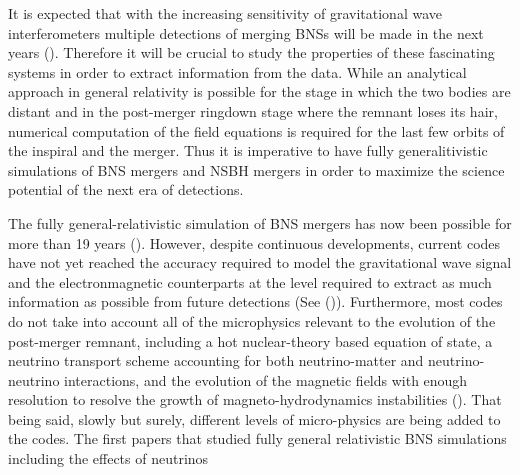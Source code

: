 It is expected that with the increasing sensitivity of gravitational wave
interferometers multiple detections of merging BNSs will be made in the next years (\cite{ligo2018gwtc}). Therefore it will be crucial
to study the properties of these fascinating systems in order to extract information
from the data. While an analytical approach in general relativity is possible for the stage in which the two
bodies are distant and in the post-merger ringdown stage where the remnant loses its hair, numerical computation of the field equations is required
for the last few orbits of the inspiral and the merger. Thus it is imperative to have fully generalitivistic simulations of BNS mergers and NSBH mergers in order to maximize the science potential of the next era of detections.

The fully general-relativistic simulation of BNS mergers has now been possible for more than 19 years (\cite{shibata2000simulation}). However, despite continuous developments, current codes have not yet reached the accuracy required to model the gravitational wave signal and the electronmagnetic counterparts at the level required to extract as much information as possible from future detections (See (\cite{barkett2015gravitational})). Furthermore, most codes do not take into account all of the microphysics relevant to the evolution of the post-merger remnant, including a hot nuclear-theory based equation of state, a neutrino transport scheme accounting for both neutrino-matter and neutrino-neutrino interactions, and the evolution of the magnetic fields with enough resolution to resolve the growth of magneto-hydrodynamics instabilities (\cite{foucart2015low}). That being said, slowly but surely, different levels of micro-physics are being added to the codes. The first papers that studied fully general relativistic BNS simulations including the effects of neutrinos
